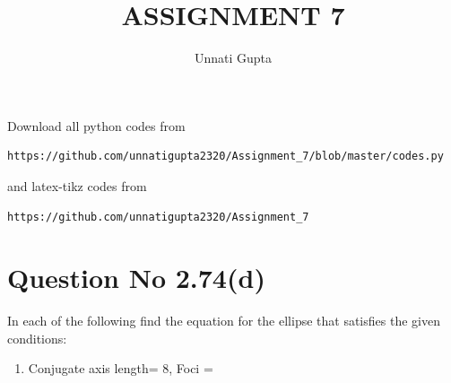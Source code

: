 \documentclass[journal,12pt,twocolumn]{IEEEtran}
\begin{document}
     \def\centbox#1{\makebox[0in]{#1}}
     \def\topbox#1{\raisebox{-\baselineskip}[0in][0in]{#1}}
     \def\midbox#1{\raisebox{-0.5\baselineskip}[0in][0in]{#1}}
\vspace{3cm}
\title{ASSIGNMENT 7}
\author{Unnati Gupta}
\maketitle
\newpage
\bigskip
\renewcommand{\thefigure}{\theenumi}
\renewcommand{\thetable}{\theenumi}
Download all python codes from 
\begin{lstlisting}
https://github.com/unnatigupta2320/Assignment_7/blob/master/codes.py
\end{lstlisting}
%
and latex-tikz codes from 
%
\begin{lstlisting}
https://github.com/unnatigupta2320/Assignment_7
\end{lstlisting}
%
\section{Question No 2.74(d)}
In each of the following find the equation for the ellipse that satisfies the given conditions:
\begin{enumerate}[label=\alph*.]
\item Conjugate axis length= 8,
Foci = 
\end{enumerate}
%
\end{document}
